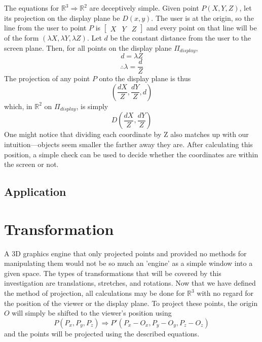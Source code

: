 \documentclass[12pt, a4paper]{article}
\begin{document}
    The equations for $\mathbb{R}^3 \Rightarrow \mathbb{R}^2$
    are deceptively simple. Given point $P(X, Y, Z)$, let its
    projection on the display plane be $D(x, y)$. The user is at
    the origin, so the line from the user to point $P$ is
    $\begin{bmatrix} X & Y & Z \end{bmatrix}$ and every point on
    that line will be of the form $(\lambda X, \lambda Y,
    \lambda Z)$. Let $d$ be the constant distance from the user
    to the screen plane. Then, for all points on the display
    plane $\Pi_{display}$, 
    \[d = \lambda Z\]
    \begin{equation}
        \therefore \lambda = \frac{d}{Z}
    \end{equation}
    The projection of any point $P$ onto the display plane is
    thus 
    \[(\frac{dX}{Z}, \frac{dY}{Z}, d)\] which, in $\mathbb{R}^2$
    on $\Pi_{display}$, is simply
    \begin{equation}
        D(\frac{dX}{Z}, \frac{dY}{Z})
    \end{equation}
    One might notice that dividing each coordinate by Z also
    matches up with our intuition---objects seem smaller the
    farther away they are. After calculating this position, a
    simple check can be used to decide whether the coordinates
    are within the screen or not.

    \subsection{Application}

    \section{Transformation}

    A 3D graphics engine that only projected points and provided
    no methods for manipulating them would not be so much an
    'engine' as a simple window into a given space. The types of
    transformations that will be covered by this investigation
    are translations, stretches, and rotations. Now that we have
    defined the method of projection, all calculations may be
    done for $\mathbb{R}^3$ with no regard for the position of
    the viewer or the display plane. To project these points,
    the origin $O$ will simply be shifted to the viewer's
    position using 
    \[P(P_x, P_y, P_z) \Rightarrow P'(P_x - O_x, P_y - O_y, P_z
    - O_z)\] and the points will be projected using the
    described equations.
\end{document}
